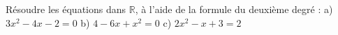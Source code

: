 \documentclass[a4paper,12pt]{report}
\begin{document}
Résoudre les équations dans $\mathbb{R}$, à l'aide de la formule du deuxième degré :
a) $3 x^2-4 x-2=0$
b) $4-6 x+x^2=0$
c) $2 x^2-x+3=2$
\end{document}
